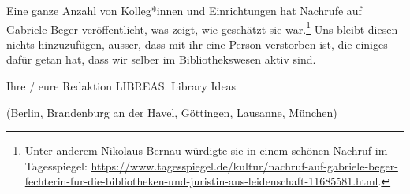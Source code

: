 \documentclass[a4paper,
fontsize=11pt,
oneside,
numbers=noperiodatend,
parskip=half-,
bibliography=totoc,
final
]{scrartcl}
\begin{document}
Eine ganze Anzahl von Kolleg*innen und Einrichtungen hat Nachrufe auf
Gabriele Beger veröffentlicht, was zeigt, wie geschätzt sie
war.\footnote{Unter anderem Nikolaus Bernau würdigte sie in einem
  schönen Nachruf im Tagesspiegel:
  \url{https://www.tagesspiegel.de/kultur/nachruf-auf-gabriele-beger-fechterin-fur-die-bibliotheken-und-juristin-aus-leidenschaft-11685581.html}.}
Uns bleibt diesen nichts hinzuzufügen, ausser, dass mit ihr eine Person
verstorben ist, die einiges dafür getan hat, dass wir selber im
Bibliothekswesen aktiv sind.

Ihre / eure Redaktion LIBREAS. Library Ideas

(Berlin, Brandenburg an der Havel, Göttingen, Lausanne, München)

\end{document}
